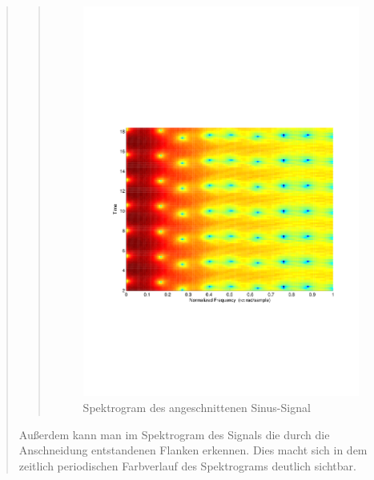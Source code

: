 \begin{quote}
\begin{quote}
        \begin{figure}[H]
                    \centering
                        \includegraphics[scale=0.4, trim = 1cm 7cm 1.5cm 8cm,
                        clip]{./Bilder/Termin8/Spectrogam}
                        \caption{Spektrogram des angeschnittenen Sinus-Signal}
                    \end{figure} 
        \end{quote}%
        


        Außerdem kann man im Spektrogram des Signals die durch die Anschneidung
        entstandenen Flanken erkennen. Dies macht sich in dem zeitlich periodischen
        Farbverlauf des Spektrograms deutlich sichtbar.\\
        

\end{quote}
